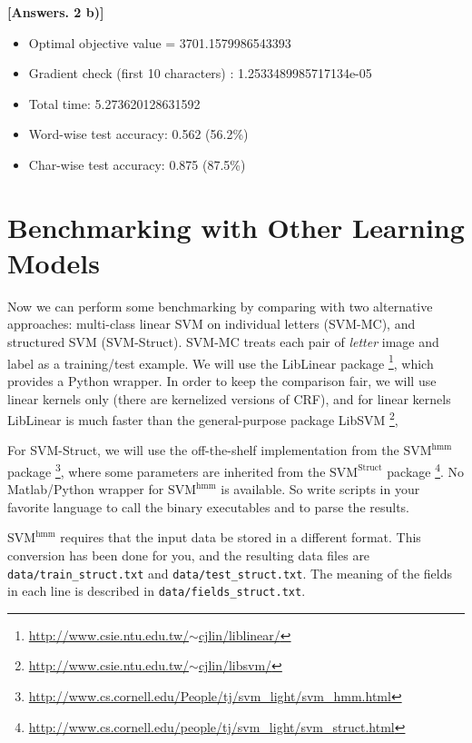 \documentclass[11pt]{report}
\begin{document}
\begin{itemize}
    {\bf [Answers. 2 b)]} 
    \begin{itemize}[-]
        \item Optimal objective value = 3701.1579986543393
        \item Gradient check (first 10 characters) : 1.2533489985717134e-05
        \item Total time: 5.273620128631592
        \item Word-wise test accuracy: 0.562 (56.2\%)
        \item Char-wise test accuracy: 0.875 (87.5\%)
    \end{itemize}

\end{itemize}



\section{Benchmarking with Other Learning Models}

Now we can perform some benchmarking by comparing with two alternative approaches:
multi-class linear SVM on individual letters (SVM-MC),
and structured SVM (SVM-Struct).
SVM-MC treats each pair of \emph{letter} image and label as a training/test example.
We will use the LibLinear package%
\footnote{\href{http://www.csie.ntu.edu.tw/~cjlin/liblinear/}{http://www.csie.ntu.edu.tw/$\sim$cjlin/liblinear/}},
which provides a Python wrapper.
In order to keep the comparison fair,
we will use linear kernels only (there are kernelized versions of CRF),
and for linear kernels LibLinear is much faster than the general-purpose package LibSVM%
\footnote{\href{http://www.csie.ntu.edu.tw/~cjlin/libsvm/}{http://www.csie.ntu.edu.tw/$\sim$cjlin/libsvm/}},


For SVM-Struct, we will use the off-the-shelf implementation from the $\text{SVM}^{\text{hmm}}$ package%
\footnote{\href{http://www.cs.cornell.edu/People/tj/svm_light/svm_hmm.html}{http://www.cs.cornell.edu/People/tj/svm\_light/svm\_hmm.html}},
where some parameters are inherited from the $\text{SVM}^{\text{Struct}}$ package%
\footnote{\href{http://www.cs.cornell.edu/people/tj/svm_light/svm_struct.html}{http://www.cs.cornell.edu/people/tj/svm\_light/svm\_struct.html}}.
No Matlab/Python wrapper for $\text{SVM}^{\text{hmm}}$ is available.
So write scripts in your favorite language to call the binary executables and to parse the results.


$\text{SVM}^{\text{hmm}}$ requires that the input data be stored in a different format.
This conversion has been done for you, and the resulting data files are \verb#data/train_struct.txt# and \verb#data/test_struct.txt#.
The meaning of the fields in each line is described in \verb#data/fields_struct.txt#.
\end{document}
